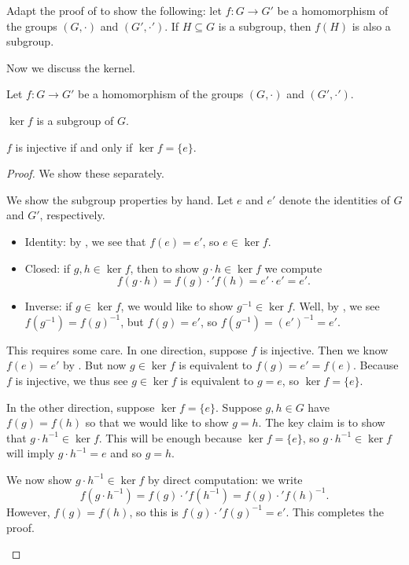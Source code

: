 \documentclass[../main.tex]{subfiles}
\begin{document}
\begin{exe}
    Adapt the proof of  to show the following: let $f\colon G\to G'$ be a homomorphism of the groups $(G,\cdot)$ and $(G',\cdot')$. If $H\subseteq G$ is a subgroup, then $f(H)$ is also a subgroup.
\end{exe}
Now we discuss the kernel.
\begin{lemma} \label{lem:ker-subgroup}
    Let $f\colon G\to G'$ be a homomorphism of the groups $(G,\cdot)$ and $(G',\cdot')$.
    \begin{listalph}
        \item $\ker f$ is a subgroup of $G$.
        \item $f$ is injective if and only if $\ker f=\{e\}$.
    \end{listalph}
\end{lemma}
\begin{proof}
    We show these separately.
    \begin{listalph}
        \item We show the subgroup properties by hand. Let $e$ and $e'$ denote the identities of $G$ and $G'$, respectively.
        \begin{itemize}
            \item Identity: by , we see that $f(e)=e'$, so $e\in\ker f$.
            \item Closed: if $g,h\in\ker f$, then to show $g\cdot h\in\ker f$ we compute
            \[f(g\cdot h)=f(g)\cdot'f(h)=e'\cdot e'=e'.\]
            \item Inverse: if $g\in\ker f$, we would like to show $g^{-1}\in\ker f$. Well, by , we see $f\left(g^{-1}\right)=f(g)^{-1}$, but $f(g)=e'$, so $f\left(g^{-1}\right)=(e')^{-1}=e'$.
        \end{itemize}
        \item This requires some care. In one direction, suppose $f$ is injective. Then we know $f(e)=e'$ by . But now $g\in\ker f$ is equivalent to $f(g)=e'=f(e)$. Because $f$ is injective, we thus see $g\in\ker f$ is equivalent to $g=e$, so $\ker f=\{e\}$.
        
        In the other direction, suppose $\ker f=\{e\}$. Suppose $g,h\in G$ have $f(g)=f(h)$ so that we would like to show $g=h$. The key claim is to show that $g\cdot h^{-1}\in\ker f$. This will be enough because $\ker f=\{e\}$, so $g\cdot h^{-1}\in\ker f$ will imply $g\cdot h^{-1}=e$ and so $g=h$.
        
        We now show $g\cdot h^{-1}\in\ker f$ by direct computation: we write
        \[f\left(g\cdot h^{-1}\right)=f(g)\cdot'f\left(h^{-1}\right)=f(g)\cdot'f(h)^{-1}.\]
        However, $f(g)=f(h)$, so this is $f(g)\cdot'f(g)^{-1}=e'$. This completes the proof.
        \qedhere
    \end{listalph}
\end{proof}
\end{document}
